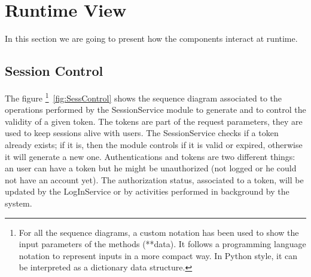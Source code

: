 \section{Runtime View}

In this section we are going to present how the components interact at runtime.

\subsection{Session Control}

The figure \footnote{For all the sequence diagrams, a custom notation has been used to show the input parameters of the methods (**data). It follows a programming language notation to represent inputs in a more compact way. In Python style, it can be interpreted as a dictionary data structure.}~\ref{fig:SessControl} shows the sequence diagram associated to the operations performed by the SessionService module to generate and to control the validity of a given token. The tokens are part of the request parameters, they are used to keep sessions alive with users. The SessionService checks if a token already exists; if it is, then the module controls if it is valid or expired, otherwise it will generate a new one.
Authentications and tokens are two different things: an user can have a token but he might be unauthorized (not logged or he could not have an account yet). The authorization status, associated to a token, will be updated by the LogInService or by activities performed in background by the system.

